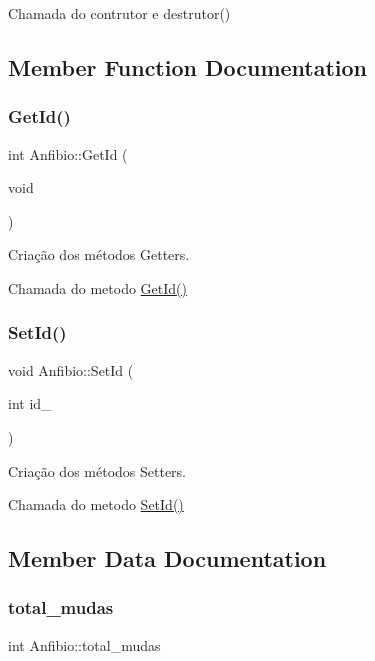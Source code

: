 Chamada do contrutor e destrutor() 

\subsection{Member Function Documentation}
\mbox{\label{class_anfibio_a88b335b835421e611f5e0705208781a0}} 
\subsubsection{\texorpdfstring{Get\+Id()}{GetId()}}
{\footnotesize\ttfamily int Anfibio\+::\+Get\+Id (\begin{DoxyParamCaption}\item[{void}]{ }\end{DoxyParamCaption})}



Criação dos métodos Getters. 

Chamada do metodo \mbox{\hyperlink{class_anfibio_a88b335b835421e611f5e0705208781a0}{Get\+Id()}} \mbox{\label{class_anfibio_a2efef746a06025c1b75c29c62f23909d}} 
\subsubsection{\texorpdfstring{Set\+Id()}{SetId()}}
{\footnotesize\ttfamily void Anfibio\+::\+Set\+Id (\begin{DoxyParamCaption}\item[{int}]{id\+\_\+ }\end{DoxyParamCaption})}



Criação dos métodos Setters. 

Chamada do metodo \mbox{\hyperlink{class_anfibio_a2efef746a06025c1b75c29c62f23909d}{Set\+Id()}} 

\subsection{Member Data Documentation}
\mbox{\label{class_anfibio_a46768866ac5b9ab108219631ea4cbfc6}} 
\subsubsection{\texorpdfstring{total\+\_\+mudas}{total\_mudas}}
{\footnotesize\ttfamily int Anfibio\+::total\+\_\+mudas\hspace{0.3cm}{\ttfamily [protected]}}



